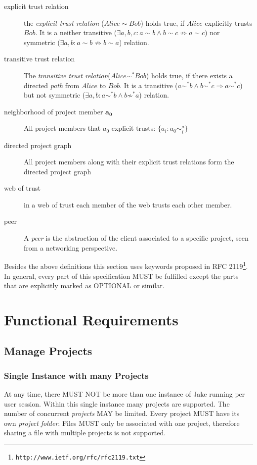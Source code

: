 \begin{description}
\item[explicit trust relation] the \emph{explicit trust relation} ($Alice \sim Bob$) holds true, if $Alice$ explicitly trusts $Bob$. It is a neither transitive ($\exists a, b, c: a \sim b \wedge b \sim c \not\Rightarrow a \sim c$) nor symmetric ($\exists a, b: a \sim b \not\Rightarrow b \sim a$) relation. 
\item[transitive trust relation] The \emph{transitive trust relation}($Alice \sim ^* Bob$) holds true, if there exists a directed \emph{path} from $Alice$ to $Bob$. It is a transitive ($a \sim ^* b \wedge b \sim ^* c \Rightarrow a \sim ^* c$) but not symmetric ($\exists a, b: a \sim ^* b \wedge b \not\sim ^* a$) relation. 
\item[neighborhood of project member $\mathbf{a_0}$] All project members that $a_0$ explicit trusts: $\{a_i: a_0 \sim ^ a_i\}$
\item[directed project graph] All project members along with their explicit trust relations form the directed project graph
\item[web of trust] in a web of trust each member of the web trusts each other member.
\item[peer] A \emph{peer} is the abstraction of the client associated to a specific project, seen from a networking perspective.
\end{description}

Besides the above definitions this section uses keywords proposed in RFC 2119\footnote{\texttt{http://www.ietf.org/rfc/rfc2119.txt}}. In general, every part of this specification MUST be fulfilled except the parts that are explicitly marked as OPTIONAL or similar.

\section{Functional Requirements}

\subsection{Manage Projects}
\subsubsection{Single Instance with many Projects}
At any time, there MUST NOT be more than one instance of Jake running per user session. Within this single instance many projects are supported. The number of concurrent \emph{projects} MAY be limited. Every project MUST have its own \emph{project folder}. Files MUST only be associated with one project, therefore sharing a file with multiple projects is not supported.

